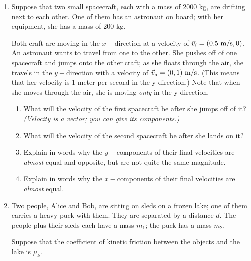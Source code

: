 \documentclass[12pt]{article}
\begin{document}
	\Large
	\centerline{}
	
	\normalsize
	\centerline{}
	
	
	\begin{enumerate}
		

	
	\item Suppose that two small spacecraft, each with a mass of 2000 kg, are drifting next to each other. One of them has an astronaut on board; with her equipment, she has a mass of 200 kg.
	
		Both craft are moving in the $x-$direction at a velocity of $\vec v_i = (0.5~\rm m/\rm s, 0)$. An astronaut wants to travel from one to the other. She pushes off of one spacecraft and jumps onto the other craft; as she floats through the air, she travels in the $y-$direction with a velocity of $\vec v_a = (0, 1) ~\rm m/\rm s$. (This means that her velocity is 1 meter per second in the y-direction.) Note that when she moves through the air, she is moving {\it only} in the y-direction.
	
	
	\begin{enumerate}
		\item What will the velocity of the first spacecraft be after she jumps off of it? {\it (Velocity is a vector; you can give its components.)}
		
		
		\item What will the velocity of the second spacecraft be after she lands on it?
		
		
		\item Explain in words why the $y-$components of their final velocities are {\it almost} equal and opposite, but are not quite the same magnitude.
		
		\item Explain in words why the $x-$components of their final velocities are {\it almost} equal.
	\end{enumerate}
	
	\bigskip
	
	
	
\item Two people, Alice and Bob, are sitting on sleds on a frozen lake; one of them carries a heavy puck with them. They are separated by a distance $d$. The people plus their sleds each have a mass $m_1$; the puck has a mass $m_2$.

Suppose that the coefficient of kinetic friction between the objects and the lake is $\mu_k$.


\end{enumerate}
\end{document}
